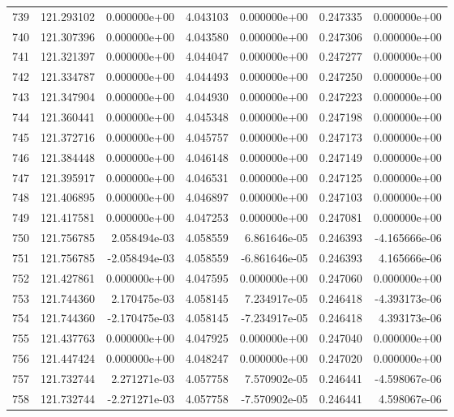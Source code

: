 \begin{tabular}{rrrrrrr}
 739 & 121.293102 &  0.000000e+00 &  4.043103 &  0.000000e+00 &    0.247335 &  0.000000e+00 \\
 740 & 121.307396 &  0.000000e+00 &  4.043580 &  0.000000e+00 &    0.247306 &  0.000000e+00 \\
 741 & 121.321397 &  0.000000e+00 &  4.044047 &  0.000000e+00 &    0.247277 &  0.000000e+00 \\
 742 & 121.334787 &  0.000000e+00 &  4.044493 &  0.000000e+00 &    0.247250 &  0.000000e+00 \\
 743 & 121.347904 &  0.000000e+00 &  4.044930 &  0.000000e+00 &    0.247223 &  0.000000e+00 \\
 744 & 121.360441 &  0.000000e+00 &  4.045348 &  0.000000e+00 &    0.247198 &  0.000000e+00 \\
 745 & 121.372716 &  0.000000e+00 &  4.045757 &  0.000000e+00 &    0.247173 &  0.000000e+00 \\
 746 & 121.384448 &  0.000000e+00 &  4.046148 &  0.000000e+00 &    0.247149 &  0.000000e+00 \\
 747 & 121.395917 &  0.000000e+00 &  4.046531 &  0.000000e+00 &    0.247125 &  0.000000e+00 \\
 748 & 121.406895 &  0.000000e+00 &  4.046897 &  0.000000e+00 &    0.247103 &  0.000000e+00 \\
 749 & 121.417581 &  0.000000e+00 &  4.047253 &  0.000000e+00 &    0.247081 &  0.000000e+00 \\
 750 & 121.756785 &  2.058494e-03 &  4.058559 &  6.861646e-05 &    0.246393 & -4.165666e-06 \\
 751 & 121.756785 & -2.058494e-03 &  4.058559 & -6.861646e-05 &    0.246393 &  4.165666e-06 \\
 752 & 121.427861 &  0.000000e+00 &  4.047595 &  0.000000e+00 &    0.247060 &  0.000000e+00 \\
 753 & 121.744360 &  2.170475e-03 &  4.058145 &  7.234917e-05 &    0.246418 & -4.393173e-06 \\
 754 & 121.744360 & -2.170475e-03 &  4.058145 & -7.234917e-05 &    0.246418 &  4.393173e-06 \\
 755 & 121.437763 &  0.000000e+00 &  4.047925 &  0.000000e+00 &    0.247040 &  0.000000e+00 \\
 756 & 121.447424 &  0.000000e+00 &  4.048247 &  0.000000e+00 &    0.247020 &  0.000000e+00 \\
 757 & 121.732744 &  2.271271e-03 &  4.057758 &  7.570902e-05 &    0.246441 & -4.598067e-06 \\
 758 & 121.732744 & -2.271271e-03 &  4.057758 & -7.570902e-05 &    0.246441 &  4.598067e-06 \\

\end{tabular}
